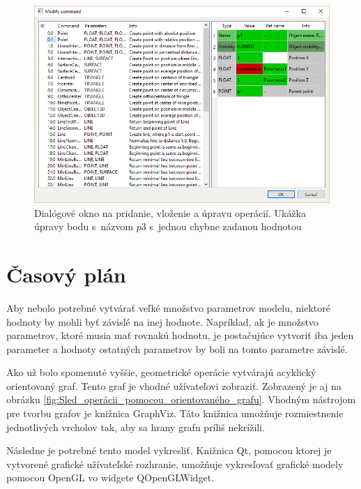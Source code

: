 \begin{figure}[hbt]
	\centering
	\includegraphics[width=1\textwidth]{obrazky-figures/Dialog.png}
	\caption{Dialógové okno na pridanie, vloženie a úpravu operácií. Ukážka úpravy bodu s~názvom $p3$ s~jednou chybne zadanou hodnotou }
	\label{fig:dialogWindow}
\end{figure}

\chapter{Časový plán}

Aby nebolo potrebné vytvárať veľké množstvo parametrov modelu, niektoré hodnoty by mohli byť závislé na inej hodnote. Napríklad, ak je množstvo parametrov, ktoré musia mať rovnakú hodnotu, je postačujúce vytvoriť iba jeden parameter a hodnoty ostatných parametrov by boli na tomto parametre závislé. 

Ako už bolo spomenuté vyššie, geometrické operácie vytvárajú acyklický orientovaný graf. Tento graf je vhodné užívateľovi zobraziť. Zobrazený je aj na obrázku \ref{fig:Sled_operácii_pomocou_orientovaného_grafu}. Vhodným nástrojom pre tvorbu grafov je knižnica GraphViz. Táto knižnica umožňuje rozmiestnenie jednotlivých vrcholov tak, aby sa hrany grafu príliš nekrížili. 


Následne je potrebné tento model vykresliť. Knižnica Qt, pomocou ktorej je vytvorené grafické užívateľské rozhranie,  umožňuje vykresľovať grafické modely pomocou OpenGL vo widgete QOpenGLWidget.


